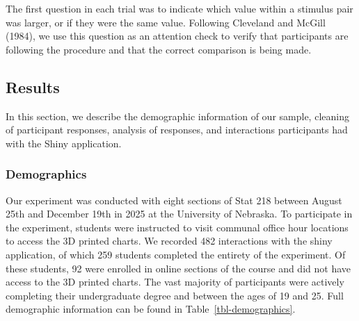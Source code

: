 \documentclass[
  letterpaper,
  DIV=11,
  numbers=noendperiod]{scrartcl}
\begin{document}
The first question in each trial was to indicate which value within a
stimulus pair was larger, or if they were the same value. Following
Cleveland and McGill (1984), we use this question as an attention check
to verify that participants are following the procedure and that the
correct comparison is being made.

\subsection{Results}\label{results}

In this section, we describe the demographic information of our sample,
cleaning of participant responses, analysis of responses, and
interactions participants had with the Shiny application.

\subsubsection{Demographics}\label{demographics}

Our experiment was conducted with eight sections of Stat 218 between
August 25th and December 19th in 2025 at the University of Nebraska. To
participate in the experiment, students were instructed to visit
communal office hour locations to access the 3D printed charts. We
recorded 482 interactions with the shiny application, of which 259
students completed the entirety of the experiment. Of these students, 92
were enrolled in online sections of the course and did not have access
to the 3D printed charts. The vast majority of participants were
actively completing their undergraduate degree and between the ages of
19 and 25. Full demographic information can be found in
Table~\ref{tbl-demographics}.
\end{document}
